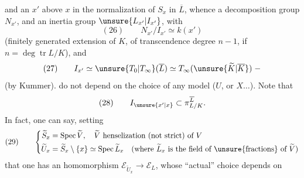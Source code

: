 and an $x'$ above $x$ in the normalization of $S_x$ in $\overline L$, whence a decomposition group $N_{x'}$, and an inertia group $\unsure{L_{x'}|I_{x'}}$, with
\[
(26)\qquad N_{x'}/I_{x'}\simeq k(x')
\]
(finitely generated extension of $K$, of transcendence degree $n-1$, if $n=\deg\operatorname{tr}L/K$), and
\[
(27)\qquad I_{x'}\simeq\unsure{T_0|T_\infty}(\overline L)\simeq T_\infty(\unsure{\widetilde K|\overline K})\;-
\]
(by Kummer).   do not depend on the choice of any  model ($U$, or $X\ldots$). Note that
\[
(28)\qquad I_{\unsure{x'|x}}\subset\pi_{L/K}^{\overline L}.
\]
In fact, one can say, setting
\[
(29)\qquad\left\{\begin{aligned}
\widetilde S_x&=\operatorname{Spec}\widetilde V,\quad\widetilde V\text{ henselization (not strict) of }V\\
\widetilde U_x&=\widetilde S_x\setminus\{x\}\simeq\operatorname{Spec}\widetilde L_x\quad(\text{where }\widetilde L_x\text{ is the field of \unsure{fractions} of }\widetilde V)
\end{aligned}\right.
\]
that one has an  homomorphism $\mathcal E_{\widetilde U_x}\longrightarrow\mathcal E_L$,  whose ``actual'' choice depends on
